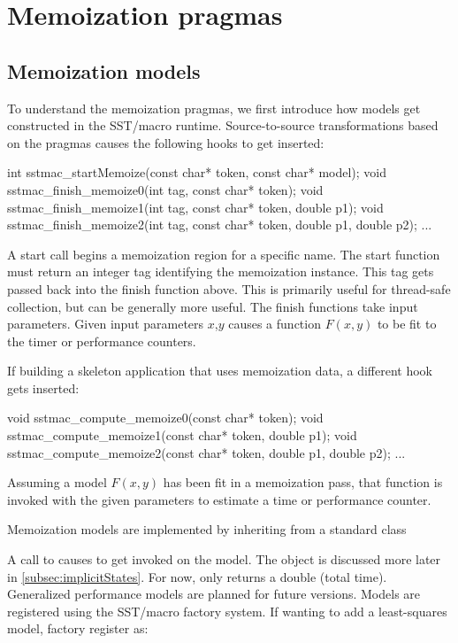 
\section{Memoization pragmas}\label{sec:memoization}

\subsection{Memoization models}
To understand the memoization pragmas, we first introduce how models get constructed in the SST/macro runtime.
Source-to-source transformations based on the pragmas causes the following hooks to get inserted:

\begin{CppCode}
int sstmac_startMemoize(const char* token, const char* model);
void sstmac_finish_memoize0(int tag, const char* token);
void sstmac_finish_memoize1(int tag, const char* token, double p1);
void sstmac_finish_memoize2(int tag, const char* token, double p1, double p2);
...
\end{CppCode}
A start call begins a memoization region for a specific name.
The start function must return an integer tag identifying the memoization instance.
This tag gets passed back into the finish function above.
This is primarily useful for thread-safe collection, but can be generally more useful.
The finish functions take input parameters. 
Given input parameters $x$,$y$ causes a function $F(x,y)$ to be fit to the timer or performance counters.

If building a skeleton application that uses memoization data, a different hook gets inserted:
\begin{CppCode}
void sstmac_compute_memoize0(const char* token);
void sstmac_compute_memoize1(const char* token, double p1);
void sstmac_compute_memoize2(const char* token, double p1, double p2);
...
\end{CppCode}
Assuming a model $F(x,y)$ has been fit in a memoization pass,
that function is invoked with the given parameters to estimate a time or performance counter.

Memoization models are implemented by inheriting from a standard class

\begin{CppCode}
struct RegressionModel {
...
virtual double compute(int n_params, const double params[], ImplicitState* state) = 0;
virtual int StartCollection() = 0;
virtual void finishCollection(int n_params, const double params[], ImplicitState* state) = 0;
...
\end{CppCode}
A call to  causes  to get invoked on the model.
The  object is discussed more later in \ref{subsec:implicitStates}.
For now,  only returns a double (total time).
Generalized performance models are planned for future versions.
Models are registered using the SST/macro factory system. 
If wanting to add a least-squares model, factory register as:

